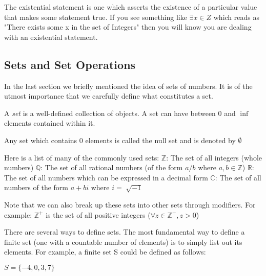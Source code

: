 The existential statement is one which asserts the existence of a particular value that makes some statement true. If you see something like $\exists x \in Z$ which reads as "There exists some x in the set of Integers" then you will know you are dealing with an existential statement.

\subsection{Sets and Set Operations}
In the last section we briefly mentioned the idea of sets of numbers. It is of the utmost importance that we carefully define what constitutes a set.

\begin{theorem}
A \emph{set} is a well-defined collection of objects. A set can have between 0 and $\inf$ elements contained within it.
\end{theorem}

\begin{definition}
Any set which contains 0 elements is called the null set and is denoted by $\emptyset$ \newline
\end{definition}

Here is a list of many of the commonly used sets: \newline
$\mathbb{Z}$: The set of all integers (whole numbers) \newline
$\mathbb{Q}$: The set of all rational numbers (of the form $a/b$ where $a,b \in \mathbb{Z}$)\newline
$\mathbb{R}$: The set of all numbers which can be expressed in a decimal form\newline
$\mathbb{C}$: The set of all numbers of the form $a+bi$ where $i= \sqrt[]{-1}$\newline

Note that we can also break up these sets into other sets through modifiers. \newline
For example: $\mathbb{Z}^+$ is the set of all positive integers ($\forall z \in \mathbb{Z}^+, z > 0$)\newline

There are several ways to define sets. The most fundamental way to define a finite set (one with a countable number of elements) is to simply list out its elements. For example, a finite set S could be defined as follows:

\begin{example}
\begin{center}
$S = \{-4,0,3,7\}$
\end{center}
\end{example}


